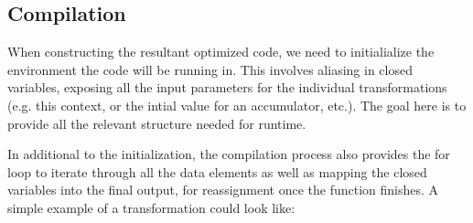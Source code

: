 \subsection{Compilation}
When constructing the resultant optimized code, we need to initialialize the environment the code will be running in.  This involves aliasing in closed variables, exposing all the input parameters for the individual transformations (e.g. this context, or the intial value for an accumulator, etc.).  The goal here is to provide all the relevant structure needed for runtime.  

In additional to the initialization, the compilation process also provides the for loop to iterate through all the data elements as well as mapping the closed variables into the final output, for reassignment once the function finishes.  A simple example of a transformation could look like:

\begin{minipage}{\linewidth}

\end{minipage}